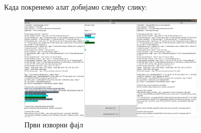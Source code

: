 \documentclass[12pt,oneside]{memoir}
\begin{document}
Када покренемо алат добијамо следећу слику:

\begin{figure}[!ht]
  \centering
  \includegraphics[width=0.8\textwidth]{a_cpp.png}
  \caption{Први изворни фајл }
  \label{fig:grafikon}
\end{figure}
\end{document}
